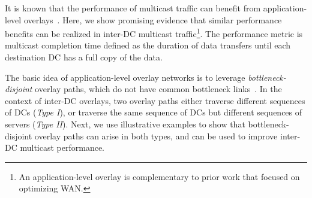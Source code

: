It is known that the performance of multicast traffic can 
benefit from application-level overlays~\cite{chu2000case}.
Here, we show promising evidence that similar
performance benefits can be realized in inter-DC multicast 
traffic\footnote{An application-level overlay is complementary to 
prior work that focused on optimizing WAN.}.
The performance metric is multicast completion time defined 
as the duration of data transfers 
until each destination DC has a full copy of the data.

The basic idea of application-level overlay networks is 
to leverage {\em bottleneck-disjoint} overlay paths, which do
not have common bottleneck links~\cite{http://www.sciencedirect.com/science/article/pii/0020019095000317}. 
In the context of inter-DC overlays, two  
overlay paths either traverse different sequences of DCs ({\em Type I}), or
traverse the same sequence of DCs but different sequences of 
servers ({\em Type II}).
Next, we use illustrative examples to show that
bottleneck-disjoint overlay paths can arise in both types, and 
can be used to improve inter-DC multicast performance.

